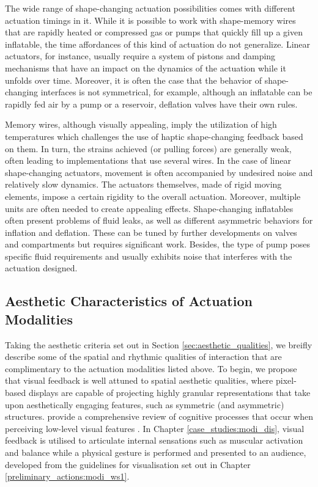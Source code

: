 The wide range of shape-changing actuation possibilities comes with different actuation timings in it. While it is possible to work with shape-memory wires that are rapidly heated or compressed gas or pumps that quickly fill up a given inflatable, the time affordances of this kind of actuation do not generalize. Linear actuators, for instance, usually require a system of pistons and damping mechanisms that have an impact on the dynamics of the actuation while it unfolds over time. Moreover, it is often the case that the behavior of shape-changing interfaces is not symmetrical, for example, although an inflatable can be rapidly fed air by a pump or a reservoir, deflation valves have their own rules.

Memory wires, although visually appealing, imply the utilization of high temperatures which challenges the use of haptic shape-changing feedback based on them. In turn, the strains achieved (or pulling forces) are generally weak, often leading to implementations that use several wires. In the case of linear shape-changing actuators, movement is often accompanied by undesired noise and relatively slow dynamics. The actuators themselves, made of rigid moving elements, impose a certain rigidity to the overall actuation. Moreover, multiple units are often needed to create appealing effects.
Shape-changing inflatables often present problems of fluid leaks, as well as different asymmetric behaviors for inflation and deflation. These can be tuned by further developments on valves and compartments but requires significant work. Besides, the type of pump poses specific fluid requirements and usually exhibits noise that interferes with the actuation designed.

\subsection*{Aesthetic Characteristics of Actuation Modalities}

Taking the aesthetic criteria set out in Section \ref{sec:aesthetic_qualities}, we breifly describe some of the spatial and rhythmic qualities of interaction that are complimentary to the actuation modalities listed above. To begin, we propose that visual feedback is well attuned to spatial aesthetic qualities, where pixel-based displays are capable of projecting highly granular representations that take upon aesthetically engaging features, such as symmetric (and asymmetric) structures. \citeauthor{li_overview_2020} provide a comprehensive review of cognitive processes that occur when perceiving low-level visual features \cite{li_overview_2020}. In Chapter \ref{case_studies:modi_dis}, visual feedback is utilised to articulate internal sensations such as muscular activation and balance while a physical gesture is performed and presented to an audience, developed from the guidelines for visualisation set out in Chapter \ref{preliminary_actions:modi_ws1}.

